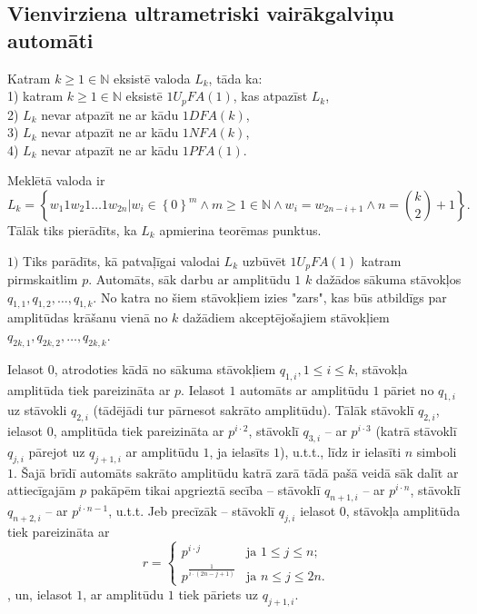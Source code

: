 \documentclass{ludis}
\begin{document}
\subsection{Vienvirziena ultrametriski vairākgalviņu automāti}
\begin{teorema}
Katram $k \geq 1 \in \mathbb{N}$ eksistē valoda $L_k$, tāda ka:\\ 
1) katram $k \geq 1 \in \mathbb{N}$ eksistē $1U_pFA(1)$, kas atpazīst $L_k$,\\ %
2) $L_k$ nevar atpazīt ne ar kādu $1DFA(k)$,\\
3) $L_k$ nevar atpazīt ne ar kādu $1NFA(k)$,\\
4) $L_k$ nevar atpazīt ne ar kādu $1PFA(1)$.
\end{teorema}
\begin{pieradijums} Meklētā valoda ir
\[
L_k = \left\{ w_1 1 w_2 1 \ldots 1 w_{2n} |
		w_i \in \left\{ 0 \right\}^m \wedge
		m \geq 1 \in \mathbb{N} \wedge
		w_i = w_{2n-i+1} \wedge
		n={k\choose 2}+1 \right\}.
\]
Tālāk tiks pierādīts, ka $L_k$ apmierina teorēmas punktus.

$1)$ Tiks parādīts, kā patvaļīgai valodai $L_k$ uzbūvēt $1U_pFA(1)$ katram pirmskaitlim $p$. Automāts, sāk darbu ar amplitūdu $1$ $k$ dažādos sākuma stāvokļos $q_{1,1},q_{1,2},\ldots,q_{1,k}$. No katra no šiem stāvokļiem izies "zars", kas būs atbildīgs par amplitūdas krāšanu vienā no $k$ dažādiem akceptējošajiem stāvokļiem $q_{2k,1},q_{2k,2},\ldots,q_{2k,k}$.

Ielasot $0$, atrodoties kādā no sākuma stāvokļiem $q_{1,i}, 1 \leq i \leq k$, stāvokļa amplitūda tiek pareizināta ar $p$. Ielasot $1$ automāts ar amplitūdu $1$ pāriet no $q_{1,i}$ uz stāvokli $q_{2,i}$ (tādējādi tur pārnesot sakrāto amplitūdu). Tālāk stāvoklī $q_{2,i}$, ielasot $0$, amplitūda tiek pareizināta ar $p^{i\cdot 2}$, stāvoklī $q_{3,i}$ -- ar $p^{i\cdot 3}$ (katrā stāvoklī $q_{j,i}$ pārejot uz $q_{j+1,i}$ ar amplitūdu $1$, ja ielasīts $1$), u.t.t., līdz ir ielasīti $n$ simboli $1$. Šajā brīdī automāts sakrāto amplitūdu katrā zarā tādā pašā veidā sāk dalīt ar attiecīgajām $p$ pakāpēm tikai apgrieztā secība -- stāvoklī $q_{n+1,i}$ -- ar $p^{i\cdot n}$, stāvoklī $q_{n+2,i}$ -- ar $p^{i\cdot n-1}$, u.t.t. Jeb precīzāk -- stāvoklī $q_{j,i}$ ielasot $0$, stāvokļa amplitūda tiek pareizināta ar
\[
r = \begin{cases}
		p^{i\cdot j} &\mbox{ja } 1 \leq j \leq n; \\
		p^\frac{1}{i\cdot (2n-j+1)} & \mbox{ja } n \leq j \leq 2n. \end{cases}
\]
, un, ielasot $1$, ar amplitūdu $1$ tiek pāriets uz $q_{j+1,i}$.


\end{pieradijums}
\end{document}
